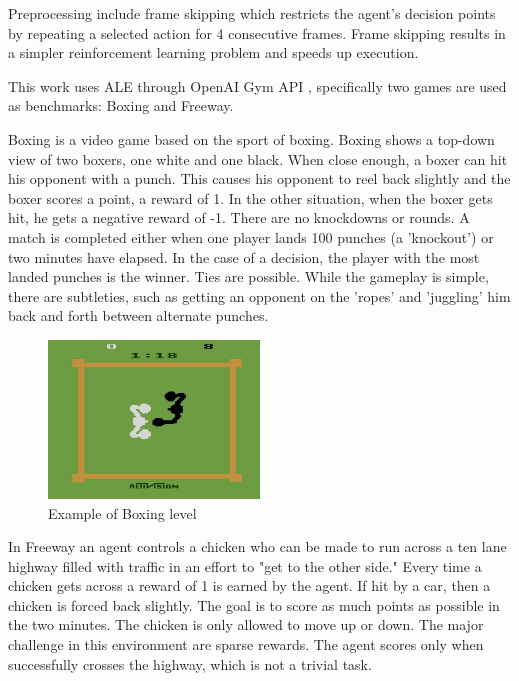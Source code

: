 Preprocessing include frame skipping \cite{Study.FrameSkipping} which restricts the agent’s decision points by repeating a selected action for 4 consecutive frames. Frame skipping results in a simpler reinforcement learning problem and speeds up execution.

This work uses ALE through OpenAI Gym API \cite{Code.OpenAIGym}, specifically two games are used as benchmarks: Boxing and Freeway.

Boxing is a video game based on the sport of boxing. Boxing shows a top-down view of two boxers, one white and one black. When close enough, a boxer can hit his opponent with a punch. This causes his opponent to reel back slightly and the boxer scores a point, a reward of 1. In the other situation, when the boxer gets hit, he gets a negative reward of -1. There are no knockdowns or rounds. A match is completed either when one player lands 100 punches (a 'knockout') or two minutes have elapsed. In the case of a decision, the player with the most landed punches is the winner. Ties are possible. 
While the gameplay is simple, there are subtleties, such as getting an opponent on the 'ropes' and 'juggling' him back and forth between alternate punches. 

\begin{figure}[H]
\includegraphics[width=0.5\textwidth,keepaspectratio]{figures/Boxing.jpg}
\caption[Sokoban]{Example of Boxing level}
\label{Fig.Boxing}
\end{figure}

In Freeway an agent controls a chicken who can be made to run across a ten lane highway filled with traffic in an effort to "get to the other side." Every time a chicken gets across a reward of 1 is earned by the agent. If hit by a car, then a chicken is forced back slightly. The goal is to score as much points as possible in the two minutes. The chicken is only allowed to move up or down. 
The major challenge in this environment are sparse rewards. The agent scores only when successfully crosses the highway, which is not a trivial task.

